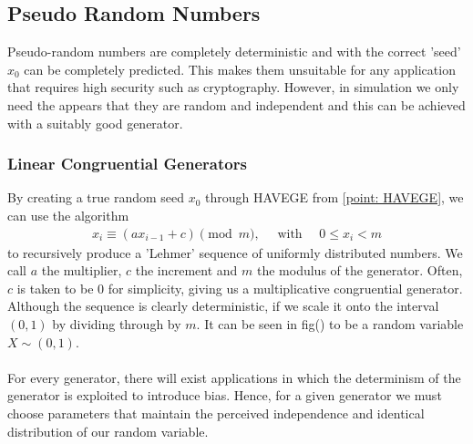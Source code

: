 \documentclass{article}
\begin{document}
\subsection{Pseudo Random Numbers}
Pseudo-random numbers are completely deterministic and with the correct 'seed' $x_0$
can be completely predicted. This makes them unsuitable for any application that requires 
high security such as cryptography. However, in simulation we only need the appears that they
are random and independent and this can be achieved with a suitably good generator.

\subsubsection{Linear Congruential Generators}
By creating a true random seed $x_0$ through HAVEGE from \ref{point: HAVEGE},
we can use the algorithm 
\begin{align} 
    \label{eq: Linear Congruential Generator}
    x_{i} \equiv (ax_{i-1} + c) \pmod{m},\quad\text{    with    }\quad0\leq x_{i}<m
\end{align}
to recursively produce a 'Lehmer' sequence of uniformly distributed numbers. 
We call $a$ the multiplier, $c$ the increment and $m$ the modulus of the generator.
Often, $c$ is taken to be $0$ for simplicity, giving us a multiplicative congruential 
generator.
Although the sequence is clearly deterministic, if we scale it onto the interval 
$(0,1)$ by dividing through by $m$. It can be seen in fig() to be a random variable
$X\sim(0,1)$. \cite{alma9954732790001381}
\\
\\
For every generator, there will exist applications in which the determinism of the generator
is exploited to introduce bias.
Hence, for a given generator we must choose parameters that maintain the perceived independence
and identical distribution of our random variable. 
\end{document}
